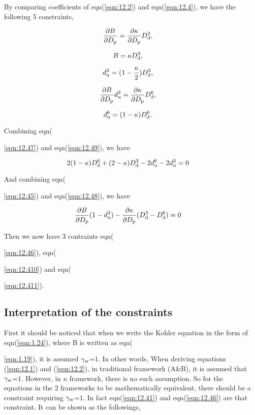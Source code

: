 \documentclass[12pt]{article}
\begin{document}
{{{{By comparing coefficients of eqn(\ref{eqn:12.2}) and eqn(\ref{eqn:12.4}), we have the following 5 constraints,

\begin{equation}\label{eqn:12.45}
\frac{\partial B}{\partial D_{\rm p}}=\frac{\partial \kappa}{\partial D_{\rm p}} D_{\rm d}^{3},
\end{equation}


\begin{equation}\label{eqn:12.46}
B=\kappa D_{\rm d}^{3},
\end{equation}

\begin{equation}\label{eqn:12.47}
d_{\rm u}^{3}=(1-\frac{\kappa}{2}) D_{\rm d}^{3}, 
\end{equation}

\begin{equation}\label{eqn:12.48}
\frac{\partial B}{\partial D_{\rm p}} d_{\rm u}^{3} = \frac{\partial \kappa}{\partial D_{\rm p}} D_{\rm d}^{6},
\end{equation}

\begin{equation}\label{eqn:12.49}
d_{\rm u}^{6}=(1-\kappa) D_{\rm d}^{6}.
\end{equation}

Combining eqn({\ref{eqn:12.47}) and eqn(\ref{eqn:12.49}), we have

\begin{equation}\label{eqn:12.410}
2(1-\kappa) D_{\rm d}^{6}+(2-\kappa)D_{\rm d}^{3}-2d_{\rm u}^{6}-2d_{\rm u}^{3}=0
\end{equation}

And combining eqn({\ref{eqn:12.45}) and eqn(\ref{eqn:12.48}), we have

\begin{equation}\label{eqn:12.411}
\frac{\partial B}{\partial D_{\rm p}}(1-d_{\rm u}^{3})-  \frac{\partial \kappa}{\partial D_{\rm p}} (D_{\rm d}^{3}-D_{\rm d}^{6})=0
\end{equation}

Then we now have 3 contraints eqn({\ref{eqn:12.46}),  eqn({\ref{eqn:12.410}) and eqn({\ref{eqn:12.411}).


\subsection{Interpretation of the constraints} 

First it should be noticed that when we write the Kohler equation in the form of eqn(\ref{eqn:1.24}), where B is written as eqn({\ref{eqn:1.19}), it is assumed $\gamma_{\rm w}$=$1$. In other words, When deriving equations (\ref{eqn:12.1}) and (\ref{eqn:12.2}), in traditional framework (A$\&$B), it is assumed that $\gamma_{\rm w}$=$1$. However, in $\kappa$ framework, there is no such assumption. So for the equations in the 2 frameworks to be mathematically equivalent, there should be a constraint requiring $\gamma_{\rm w}$=$1$. In fact eqn(\ref{eqn:12.41}) and eqn(\ref{eqn:12.46}) are that constraint. It can be shown as the followings,


}}}}}}}}}}
\end{document}
